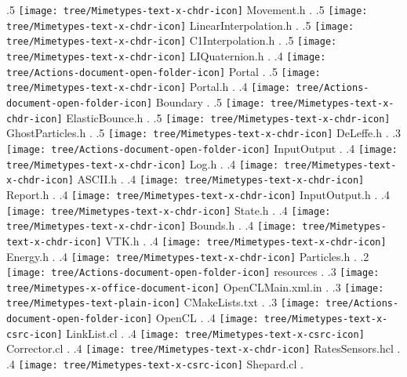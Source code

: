 {.5 { \texttt{[image: tree/Mimetypes-text-x-chdr-icon]} Movement.h }.
.5 { \texttt{[image: tree/Mimetypes-text-x-chdr-icon]} LinearInterpolation.h }.
.5 { \texttt{[image: tree/Mimetypes-text-x-chdr-icon]} C1Interpolation.h }.
.5 { \texttt{[image: tree/Mimetypes-text-x-chdr-icon]} LIQuaternion.h }.
.4 { \texttt{[image: tree/Actions-document-open-folder-icon]} Portal }.
.5 { \texttt{[image: tree/Mimetypes-text-x-chdr-icon]} Portal.h }.
.4 { \texttt{[image: tree/Actions-document-open-folder-icon]} Boundary }.
.5 { \texttt{[image: tree/Mimetypes-text-x-chdr-icon]} ElasticBounce.h }.
.5 { \texttt{[image: tree/Mimetypes-text-x-chdr-icon]} GhostParticles.h }.
.5 { \texttt{[image: tree/Mimetypes-text-x-chdr-icon]} DeLeffe.h }.
.3 { \texttt{[image: tree/Actions-document-open-folder-icon]} InputOutput }.
.4 { \texttt{[image: tree/Mimetypes-text-x-chdr-icon]} Log.h }.
.4 { \texttt{[image: tree/Mimetypes-text-x-chdr-icon]} ASCII.h }.
.4 { \texttt{[image: tree/Mimetypes-text-x-chdr-icon]} Report.h }.
.4 { \texttt{[image: tree/Mimetypes-text-x-chdr-icon]} InputOutput.h }.
.4 { \texttt{[image: tree/Mimetypes-text-x-chdr-icon]} State.h }.
.4 { \texttt{[image: tree/Mimetypes-text-x-chdr-icon]} Bounds.h }.
.4 { \texttt{[image: tree/Mimetypes-text-x-chdr-icon]} VTK.h }.
.4 { \texttt{[image: tree/Mimetypes-text-x-chdr-icon]} Energy.h }.
.4 { \texttt{[image: tree/Mimetypes-text-x-chdr-icon]} Particles.h }.
.2 { \texttt{[image: tree/Actions-document-open-folder-icon]} resources }.
.3 { \texttt{[image: tree/Mimetypes-x-office-document-icon]} OpenCLMain.xml.in }.
.3 { \texttt{[image: tree/Mimetypes-text-plain-icon]} CMakeLists.txt }.
.3 { \texttt{[image: tree/Actions-document-open-folder-icon]} OpenCL }.
.4 { \texttt{[image: tree/Mimetypes-text-x-csrc-icon]} LinkList.cl }.
.4 { \texttt{[image: tree/Mimetypes-text-x-csrc-icon]} Corrector.cl }.
.4 { \texttt{[image: tree/Mimetypes-text-x-chdr-icon]} RatesSensors.hcl }.
.4 { \texttt{[image: tree/Mimetypes-text-x-csrc-icon]} Shepard.cl }.
}
